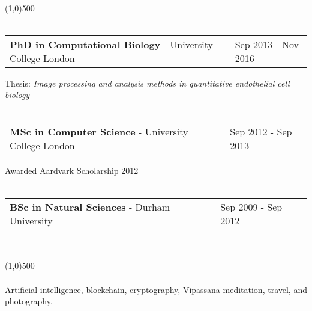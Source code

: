 \documentclass[11pt]{res}
\begin{document}
\vspace{-1.2em}
\begin{flushleft}
\\
\end{flushleft}
\vspace{-3.2em}
\line(1,0){500}\\
\vspace*{-0.3cm}
\nolinebreak\\
\begin{tabular}{@{} p{13.7cm} p{3.5cm} @{}} {\bf PhD in Computational Biology} - University College London & Sep 2013 - Nov 2016 \end{tabular}
	\textcolor{mygray}{\qquad Thesis: {\sl Image processing and analysis methods in quantitative endothelial cell biology}}\\
\vspace{-0.75em}\\
\begin{tabular}{@{} p{13.7cm} p{3.5cm} @{}} {\bf MSc in Computer Science} - University College London & Sep 2012 - Sep 2013 \end{tabular}
	\textcolor{mygray}{\qquad Awarded Aardvark Scholarship 2012}\\
\vspace{-0.75em}\\
\begin{tabular}{@{} p{13.7cm} p{3.5cm} @{}} {\bf BSc in Natural Sciences} - Durham University & Sep 2009 - Sep 2012 \end{tabular}
\vspace{-0.75em}

\vspace{-1.2em}
\begin{flushleft}
\\
\end{flushleft}
\vspace{-3.2em}
\line(1,0){500}\\
\vspace*{-0.3cm}
\nolinebreak\\
Artificial intelligence, blockchain, cryptography, Vipassana meditation, travel, and photography.
\end{document}
